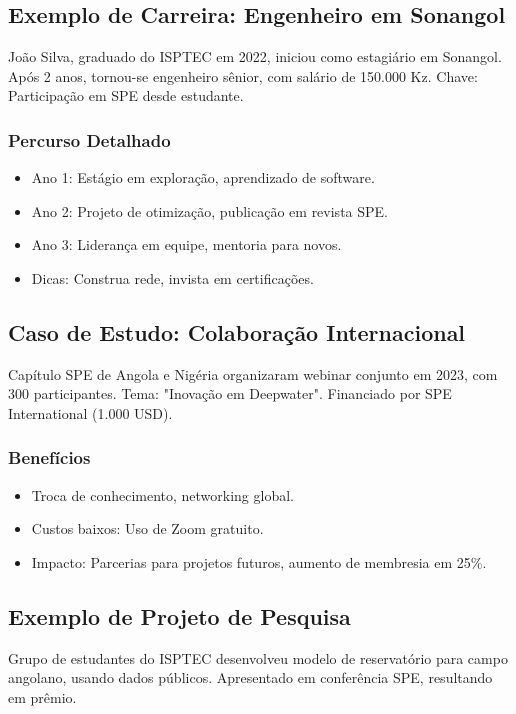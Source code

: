 \documentclass[12pt]{article}
\begin{document}
\subsection{Exemplo de Carreira: Engenheiro em Sonangol}
João Silva, graduado do ISPTEC em 2022, iniciou como estagiário em Sonangol. Após 2 anos, tornou-se engenheiro sênior, com salário de 150.000 Kz. Chave: Participação em SPE desde estudante.

\subsubsection{Percurso Detalhado}
\begin{itemize}
    \item Ano 1: Estágio em exploração, aprendizado de software.
    \item Ano 2: Projeto de otimização, publicação em revista SPE.
    \item Ano 3: Liderança em equipe, mentoria para novos.
    \item Dicas: Construa rede, invista em certificações.
\end{itemize}

\subsection{Caso de Estudo: Colaboração Internacional}
Capítulo SPE de Angola e Nigéria organizaram webinar conjunto em 2023, com 300 participantes. Tema: "Inovação em Deepwater". Financiado por SPE International (1.000 USD).

\subsubsection{Benefícios}
\begin{itemize}
    \item Troca de conhecimento, networking global.
    \item Custos baixos: Uso de Zoom gratuito.
    \item Impacto: Parcerias para projetos futuros, aumento de membresia em 25\%.
\end{itemize}

\subsection{Exemplo de Projeto de Pesquisa}
Grupo de estudantes do ISPTEC desenvolveu modelo de reservatório para campo angolano, usando dados públicos. Apresentado em conferência SPE, resultando em prêmio.
\end{document}
